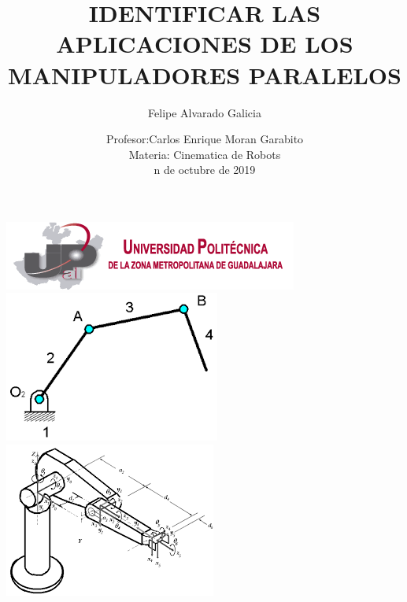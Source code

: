 \documentclass[12pt,a4paper]{article}
\author{Felipe Alvarado Galicia}
\title{IDENTIFICAR LAS APLICACIONES DE LOS MANIPULADORES PARALELOS}
\date{Profesor:Carlos Enrique Moran Garabito\\
Materia: Cinematica de Robots\\
n de octubre de 2019}
\begin{document}
\maketitle
 \includegraphics[scale=1]{logo1.png}\\
\includegraphics[scale=1]{imag5.png} 
\includegraphics[scale=1]{imag8.png}\\\\\\\\\\\\\\\\\\\\\\\\\\\\\\\\\\\\\\\\\
\end{document}
